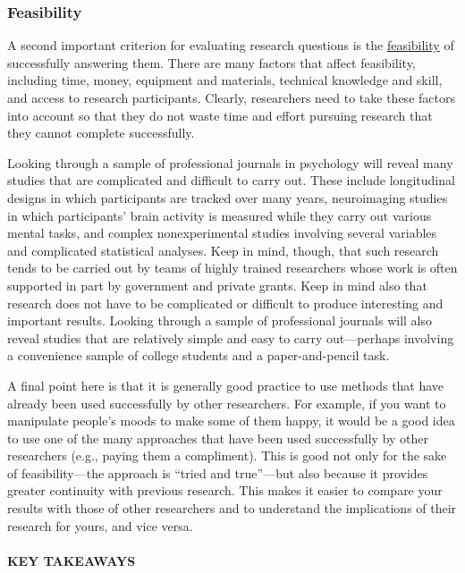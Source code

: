 \documentclass[
]{krantz}
\begin{document}
\hypertarget{feasibility}{%
\subsubsection*{Feasibility}\label{feasibility}}


A second important criterion for evaluating research questions is the \protect\hyperlink{feasibility-1}{feasibility} of successfully answering them. There are many factors that affect feasibility, including time, money, equipment and materials, technical knowledge and skill, and access to research participants. Clearly, researchers need to take these factors into account so that they do not waste time and effort pursuing research that they cannot complete successfully.

Looking through a sample of professional journals in psychology will reveal many studies that are complicated and difficult to carry out. These include longitudinal designs in which participants are tracked over many years, neuroimaging studies in which participants' brain activity is measured while they carry out various mental tasks, and complex nonexperimental studies involving several variables and complicated statistical analyses. Keep in mind, though, that such research tends to be carried out by teams of highly trained researchers whose work is often supported in part by government and private grants. Keep in mind also that research does not have to be complicated or difficult to produce interesting and important results. Looking through a sample of professional journals will also reveal studies that are relatively simple and easy to carry out---perhaps involving a convenience sample of college students and a paper-and-pencil task.

A final point here is that it is generally good practice to use methods that have already been used successfully by other researchers. For example, if you want to manipulate people's moods to make some of them happy, it would be a good idea to use one of the many approaches that have been used successfully by other researchers (e.g., paying them a compliment). This is good not only for the sake of feasibility---the approach is ``tried and true''---but also because it provides greater continuity with previous research. This makes it easier to compare your results with those of other researchers and to understand the implications of their research for yours, and vice versa.

\hypertarget{key-takeaways-29}{%
\paragraph*{KEY TAKEAWAYS}\label{key-takeaways-29}}
\end{document}
